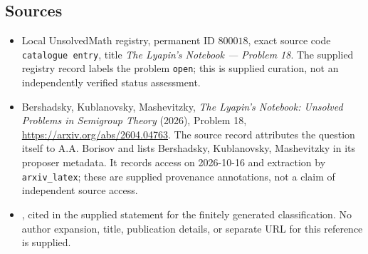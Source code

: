 \documentclass[11pt]{article}
\begin{document}
\subsection{Sources}
\begin{itemize}
\item Local UnsolvedMath registry, permanent ID \(800018\), exact source code \texttt{catalogue entry}, title \emph{The Lyapin's Notebook --- Problem 18}. The supplied registry record labels the problem \texttt{open}; this is supplied curation, not an independently verified status assessment.
\item Bershadsky, Kublanovsky, Mashevitzky, \emph{The Lyapin's Notebook: Unsolved Problems in Semigroup Theory} (2026), Problem 18, \url{https://arxiv.org/abs/2604.04763}. The source record attributes the question itself to A.A. Borisov and lists Bershadsky, Kublanovsky, Mashevitzky in its proposer metadata. It records access on 2026-10-16 and extraction by \texttt{arxiv\_latex}; these are supplied provenance annotations, not a claim of independent source access.
\item [Borisov4], cited in the supplied statement for the finitely generated classification. No author expansion, title, publication details, or separate URL for this reference is supplied.
\end{itemize}
\end{document}
